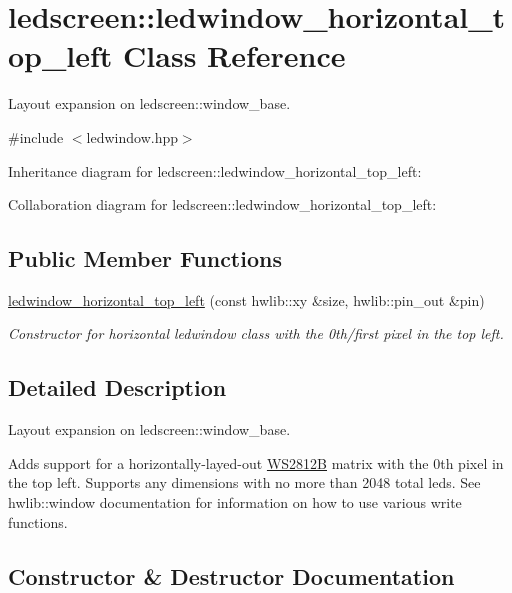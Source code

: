 \hypertarget{classledscreen_1_1ledwindow__horizontal__top__left}{}\section{ledscreen\+:\+:ledwindow\+\_\+horizontal\+\_\+top\+\_\+left Class Reference}
\label{classledscreen_1_1ledwindow__horizontal__top__left}


Layout expansion on ledscreen\+::window\+\_\+base.  




{\ttfamily \#include $<$ledwindow.\+hpp$>$}



Inheritance diagram for ledscreen\+:\+:ledwindow\+\_\+horizontal\+\_\+top\+\_\+left\+:


Collaboration diagram for ledscreen\+:\+:ledwindow\+\_\+horizontal\+\_\+top\+\_\+left\+:
\subsection*{Public Member Functions}
\begin{DoxyCompactItemize}
\item 
\hyperlink{classledscreen_1_1ledwindow__horizontal__top__left_ae67e8cc9e161ef524f20e923c0f0e4fe}{ledwindow\+\_\+horizontal\+\_\+top\+\_\+left} (const hwlib\+::xy \&size, hwlib\+::pin\+\_\+out \&pin)
\begin{DoxyCompactList}\small\item\em Constructor for horizontal ledwindow class with the 0th/first pixel in the top left. \end{DoxyCompactList}\end{DoxyCompactItemize}


\subsection{Detailed Description}
Layout expansion on ledscreen\+::window\+\_\+base. 

Adds support for a horizontally-\/layed-\/out \hyperlink{classledscreen_1_1WS2812B}{W\+S2812B} matrix with the 0th pixel in the top left. Supports any dimensions with no more than 2048 total leds. See hwlib\+::window documentation for information on how to use various write functions. 

\subsection{Constructor \& Destructor Documentation}
\mbox{\label{classledscreen_1_1ledwindow__horizontal__top__left_ae67e8cc9e161ef524f20e923c0f0e4fe}} 

